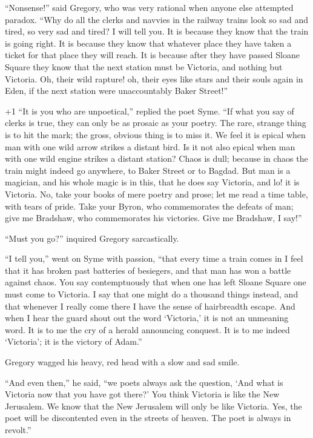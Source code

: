 “Nonsense!” said Gregory, who was very rational when anyone else attempted paradox. “Why do all the clerks and navvies in the railway trains look so sad and tired, so very sad and tired? I will tell you. It is because they know that the train is going right. It is because they know that whatever place they have taken a ticket for that place they will reach. It is because after they have passed Sloane Square they know that the next station must be Victoria, and nothing but Victoria. Oh, their wild rapture! oh, their eyes like stars and their souls again in Eden, if the next station were unaccountably Baker Street!”

\looseness+1
“It is you who are unpoetical,” replied the poet Syme. “If what you say of clerks is true, they can only be as prosaic as your poetry. The rare, strange thing is to hit the mark; the gross, obvious thing is to miss it. We feel it is epical when man with one wild arrow strikes a distant bird. Is it not also epical when man with one wild engine strikes a distant station? Chaos is dull; because in chaos the train might indeed go anywhere, to Baker Street or to Bagdad. But man is a magician, and his whole magic is in this, that he does say Victoria, and lo! it is Victoria. No, take your books of mere poetry and prose; let me read a time table, with tears of pride. Take your Byron, who commemorates the defeats of man; give me Bradshaw, who commemorates his victories. Give me Bradshaw, I say!”

“Must you go?” inquired Gregory sarcastically.

“I tell you,” went on Syme with passion, “that every time a train comes in I feel that it has broken past batteries of besiegers, and that man has won a battle against chaos. You say contemptuously that when one has left Sloane Square one must come to Victoria. I say that one might do a thousand things instead, and that whenever I really come there I have the sense of hairbreadth escape. And when I hear the guard shout out the word ‘Victoria,’ it is not an unmeaning word. It is to me the cry of a herald announcing conquest. It is to me indeed ‘Victoria’; it is the victory of Adam.”

Gregory wagged his heavy, red head with a slow and sad smile.

“And even then,” he said, “we poets always ask the question, ‘And what is Victoria now that you have got there?’ You think Victoria is like the New Jerusalem. We know that the New Jerusalem will only be like Victoria. Yes, the poet will be discontented even in the streets of heaven. The poet is always in revolt.”

